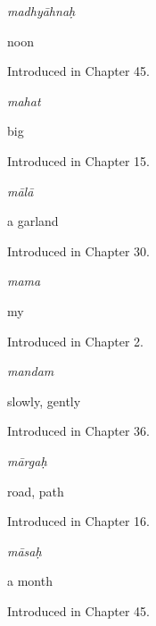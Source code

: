 \noindent\begin{minipage}[t]{\linewidth}
\raggedright
\textbf{}\enspace\emph{madhyāhnaḥ}\par
\small noon\par
\footnotesize Introduced in Chapter 45.
\end{minipage}\par\medskip

\noindent\begin{minipage}[t]{\linewidth}
\raggedright
\textbf{}\enspace\emph{mahat}\par
\small big\par
\footnotesize Introduced in Chapter 15.
\end{minipage}\par\medskip

\noindent\begin{minipage}[t]{\linewidth}
\raggedright
\textbf{}\enspace\emph{mālā}\par
\small a garland\par
\footnotesize Introduced in Chapter 30.
\end{minipage}\par\medskip

\noindent\begin{minipage}[t]{\linewidth}
\raggedright
\textbf{}\enspace\emph{mama}\par
\small my\par
\footnotesize Introduced in Chapter 2.
\end{minipage}\par\medskip

\noindent\begin{minipage}[t]{\linewidth}
\raggedright
\textbf{}\enspace\emph{mandam}\par
\small slowly, gently\par
\footnotesize Introduced in Chapter 36.
\end{minipage}\par\medskip

\noindent\begin{minipage}[t]{\linewidth}
\raggedright
\textbf{}\enspace\emph{mārgaḥ}\par
\small road, path\par
\footnotesize Introduced in Chapter 16.
\end{minipage}\par\medskip

\noindent\begin{minipage}[t]{\linewidth}
\raggedright
\textbf{}\enspace\emph{māsaḥ}\par
\small a month\par
\footnotesize Introduced in Chapter 45.
\end{minipage}\par\medskip

